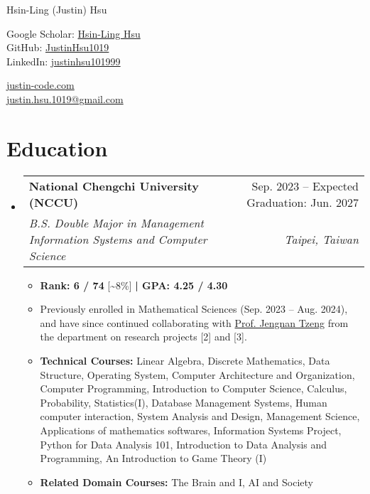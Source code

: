 \documentclass[letterpaper,10pt]{article}
\makeatletter
\newcommand{\resumeItem}[1]{
  \item\small{
    {#1 \vspace{-2pt}}
  }
}
\newcommand{\resumeSubheading}[4]{
  \vspace{-2pt}\item
    \begin{tabular*}{0.97\textwidth}[t]{l@{\extracolsep{\fill}}r}
      \textbf{#1} & #2 \\
      \textit{\small#3} & \textit{\small #4} \\
    \end{tabular*}\vspace{-7pt}
}
\newcommand{\resumeSubHeadingListStart}{\begin{itemize}[leftmargin=0.15in, label={}]}
\newcommand{\resumeSubHeadingListEnd}{\end{itemize}}
\newcommand{\resumeItemListStart}{\begin{itemize}}
\newcommand{\resumeItemListEnd}{\end{itemize}\vspace{-5pt}}
\makeatother
\begin{document}
\begin{center}
    {\LARGE Hsin-Ling (Justin) Hsu} \\ \vspace{2pt}
    \begin{multicols}{2}
    \begin{flushleft}
    Google Scholar: \href{{https://scholar.google.com/citations?user=pCXJM5AAAAAJ}}{Hsin-Ling Hsu} \\ \vspace{1pt}
    GitHub: \href{{https://github.com/justinHsu1019}}{JustinHsu1019}\\ \vspace{1pt}
    LinkedIn: \href{{https://www.linkedin.com/in/justinhsu101999}}{justinhsu101999}
    \end{flushleft}
    \begin{flushright}
    \href{{https://justin-code.com}}{justin-code.com}\\ \vspace{5pt}
    \href{mailto:justin.hsu.1019@gmail.com}{justin.hsu.1019@gmail.com}
    \end{flushright}
    \end{multicols}
\end{center}

\vspace{-2pt}
\section{Education}
  \resumeSubHeadingListStart
      \resumeSubheading
      {National Chengchi University (NCCU)}{Sep. 2023 – Expected Graduation: Jun. 2027}
      {B.S. Double Major in Management Information Systems and Computer Science}{Taipei, Taiwan}
      \resumeItemListStart
      \vspace{0.3em}
        \resumeItem{\textbf{Rank: 6 / 74} [\textasciitilde8\%] \textbf{| GPA: 4.25 / 4.30}}
        \resumeItem{Previously enrolled in Mathematical Sciences (Sep. 2023 -- Aug. 2024), and have since continued collaborating with \href{https://ms.nccu.edu.tw/PageStaffing/Detail?fid=4666\&id=1118}{Prof. Jengnan Tzeng} from the department on research projects [2] and [3].}
        \resumeItem{\textbf{Technical Courses:} Linear Algebra, Discrete Mathematics, Data Structure, Operating System, Computer Architecture and Organization, Computer Programming, Introduction to Computer Science, Calculus, Probability, Statistics(I), Database Management Systems, Human computer interaction, System Analysis and Design, Management Science, Applications of mathematics softwares, Information Systems Project, Python for Data Analysis 101, Introduction to Data Analysis and Programming, An Introduction to Game Theory (I)}
        \resumeItem{\textbf{Related Domain Courses:} The Brain and I, AI and Society}
      \resumeItemListEnd
  \resumeSubHeadingListEnd
\end{document}
